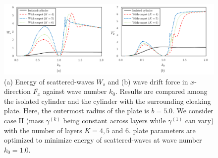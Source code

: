\documentclass{jfm}
\begin{document}
\begin{figure}
 \centering
 \includegraphics[width=5.4in]{fig/fig6.png}
 \caption{(a) Energy of scattered-waves $W_s$ and (b) wave drift force in $x$-direction $\overline{F_x}$ against wave number $k_0$. Results are compared among the isolated cylinder and the cylinder with the surrounding cloaking plate. Here, the outermost radius of the plate is $b=5.0$.  We consider case II (mass $\gamma^{(k)}$ being constant across layers while $\gamma^{(1)}$ can vary) with the number of layers $K=4,5$ and 6. plate parameters are optimized to minimize energy of scattered-waves at wave number $k_0=1.0$. }
 \label{fig6}
\end{figure}
\end{document}
